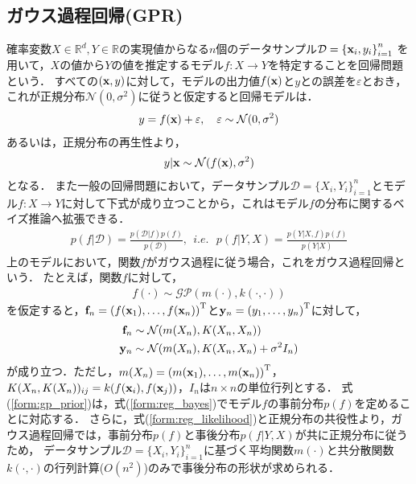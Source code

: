 \documentclass[11pt,a4j]{article}
\begin{document}
    \subsection{ガウス過程回帰(GPR)}
      確率変数$X \in \mathbb{R}^{d}, Y \in \mathbb{R}$の実現値からなる$n$個のデータサンプル$\mathcal{D} = {\{ {\bf x}_i, y_i \}}_{i=1}^n$
      を用いて，$X$の値から$Y$の値を推定するモデル$f:X \to Y$を特定することを回帰問題という．
      すべての$({\bf x}, y)$に対して，モデルの出力値$f({\bf x})$と$y$との誤差を$\varepsilon$とおき，これが正規分布$\mathcal{N}(0, \sigma^2)$に従うと仮定すると回帰モデルは．
      \begin{align}
        y = f({\bf x}) + \varepsilon, ~~~ \varepsilon \sim \mathcal{N}(0, \sigma^2)
      \end{align}
      あるいは，正規分布の再生性より，
      \begin{align}
        y | {\bf x} \sim \mathcal{N}(f({\bf x}), \sigma^2) \label{form:reg_likelihood}
      \end{align}
      となる．
      また一般の回帰問題において，データサンプル$\mathcal{D} = {\{ X_i, Y_i \}}_{i=1}^n$とモデル$f:X \to Y$に対して下式が成り立つことから，これはモデル$f$の分布に関するベイズ推論へ拡張できる．
      \begin{align}
        p(f|\mathcal{D}) = \frac{p(\mathcal{D}|f)p(f)}{p(\mathcal{D})}, ~~i.e.~~~
        p(f | Y,X) = \frac{ p( Y | X, f) p(f) }{p( Y | X )} \label{form:reg_bayes}
      \end{align}
      上のモデルにおいて，関数$f$がガウス過程に従う場合，これをガウス過程回帰という．
      たとえば，関数$f$に対して，
      \begin{align}
        f(\cdot) \sim \mathcal{GP}(m(\cdot), k(\cdot,\cdot)) \label{form:gp_prior}
      \end{align}
      を仮定すると，${\bf f}_n = { ( f({\bf x}_1),\dots,f({\bf x}_n) ) }^{\mathrm{T}}$と${\bf y}_n = {( y_1,\dots,y_n )}^{\mathrm{T}}$に対して，
      \begin{align}
        {\bf f}_n &\sim \mathcal{N}(m(X_n), K(X_n,X_n)) \\
        {\bf y}_n &\sim \mathcal{N}(m(X_n), K(X_n,X_n) + \sigma^2 I_n)
      \end{align}
      が成り立つ．ただし，$ m(X_n) = { ( m({\bf x}_1), \dots, m({\bf x}_n) ) }^{\mathrm{T}} $，
      $K(X_n,K(X_n))_{ij} = k(f({\bf x}_i), f({\bf x}_j))$，$I_n$は$n \times n$の単位行列とする．
      式(\ref{form:gp_prior})は，式(\ref{form:reg_bayes})でモデル$f$の事前分布$p(f)$を定めることに対応する．
      さらに，式(\ref{form:reg_likelihood})と正規分布の共役性より，ガウス過程回帰では，事前分布$p(f)$と事後分布$p(f|Y,X)$が共に正規分布に従うため，
      データサンプル$\mathcal{D} = {\{ X_i, Y_i \}}_{i=1}^n$に基づく平均関数$m(\cdot)$と共分散関数$k(\cdot,\cdot)$の行列計算($O(n^2)$)のみで事後分布の形状が求められる．
      
\end{document}
